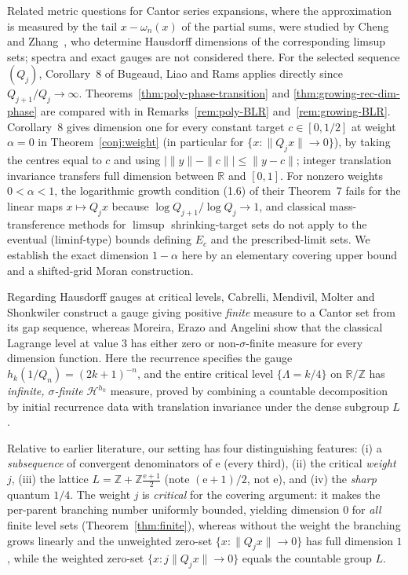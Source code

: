 \documentclass[11pt]{article}
\theoremstyle{definition}
\theoremstyle{remark}
\newcommand{\R}{\mathbb{R}}
\newcommand{\Z}{\mathbb{Z}}
\newcommand{\ee}{\mathrm{e}}
\newcommand{\Lam}{\Lambda}
\begin{document}
Related metric questions for Cantor series expansions, where the approximation
is measured by the tail $x-\omega_n(x)$ of the partial sums, were studied by
Cheng and Zhang~\cite{CZ}, who determine Hausdorff dimensions of the
corresponding limsup sets; spectra and exact gauges are not considered there.
For the selected sequence $(Q_j)$, Corollary~8 of Bugeaud, Liao and Rams
\cite{BLR} applies directly since $Q_{j+1}/Q_j\to\infty$. Theorems~\ref{thm:poly-phase-transition} and
\ref{thm:growing-rec-dim-phase} are compared with \cite{BLR} in
Remarks~\ref{rem:poly-BLR} and~\ref{rem:growing-BLR}. Corollary~8 gives dimension
one for every constant target $c\in[0,1/2]$ at weight $\alpha=0$ in
Theorem~\ref{conj:weight} (in particular for $\{x:\|Q_jx\|\to0\}$), by taking
the centres equal to $c$ and using $|\|y\|-\|c\||\le\|y-c\|$; integer
translation invariance transfers full dimension between $\R$ and $[0,1]$. For
nonzero weights $0<\alpha<1$, the logarithmic growth condition (1.6) of their
Theorem~7 fails for the linear maps $x\mapsto Q_jx$ because
$\log Q_{j+1}/\log Q_j\to1$, and classical mass-transference methods for
$\limsup$ shrinking-target sets \cite{BV} do not apply to the eventual
(liminf-type) bounds defining $E_c$ and the prescribed-limit sets. We establish
the exact dimension $1-\alpha$ here by an elementary covering upper bound and a
shifted-grid Moran construction.

Regarding Hausdorff gauges at critical levels, Cabrelli, Mendivil, Molter and
Shonkwiler \cite[\S5, Theorem~3]{CMMS} construct a gauge giving positive
\emph{finite} measure to a Cantor set from its gap sequence, whereas Moreira,
Erazo and Angelini \cite{MEA} show that the classical Lagrange level at value
$3$ has either zero or non-$\sigma$-finite measure for every dimension function.
Here the recurrence specifies the gauge $h_k(1/Q_n)=(2k+1)^{-n}$, and the entire
critical level $\{\Lam=k/4\}$ on $\R/\Z$ has \emph{infinite, $\sigma$-finite}
$\mathcal H^{h_k}$ measure, proved by combining a countable decomposition by
initial recurrence data with translation invariance under the dense subgroup
$L$.

Relative to earlier literature, our setting has four distinguishing features:
(i) a \emph{subsequence} of convergent denominators of $\ee$ (every third),
(ii) the critical \emph{weight} $j$, (iii) the lattice
$L=\Z+\Z\frac{\ee+1}{2}$ (note $(\ee+1)/2$, not $\ee$), and (iv) the
\emph{sharp} quantum $1/4$. The weight $j$ is \emph{critical} for the covering
argument: it makes the per-parent branching number uniformly bounded, yielding
dimension $0$ for \emph{all} finite level sets (Theorem~\ref{thm:finite}),
whereas without the weight the branching grows linearly and the unweighted
zero-set $\{x:\|Q_jx\|\to0\}$ has full dimension $1$, while the weighted
zero-set $\{x:j\|Q_jx\|\to0\}$ equals the countable group $L$.
\end{document}
